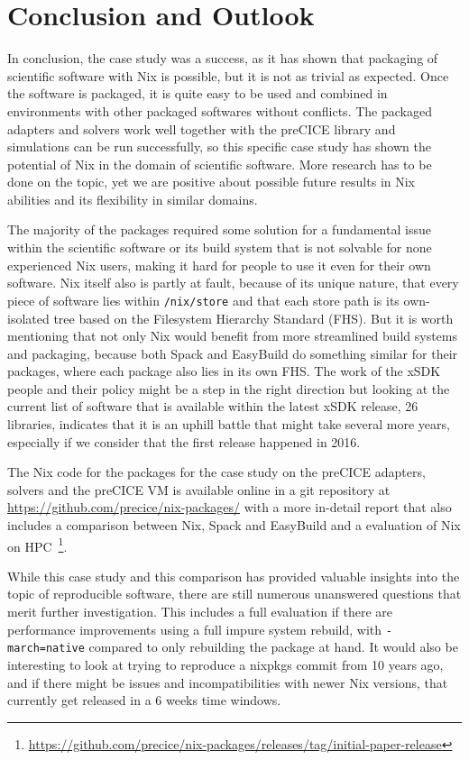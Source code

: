 \documentclass{eceasst}
\begin{document}
\section{Conclusion and Outlook}

In conclusion, the case study was a success, as it has shown that packaging of scientific software with Nix is possible, but it is not as trivial as expected.
Once the software is packaged, it is quite easy to be used and combined in environments with other packaged softwares without conflicts.
The packaged adapters and solvers work well together with the preCICE library and simulations can be run successfully, so this specific case study has shown the potential of Nix in the domain of scientific software.
More research has to be done on the topic, yet we are positive about possible future results in Nix abilities and its flexibility in similar domains.

The majority of the packages required some solution for a fundamental issue within the scientific software or its build system that is not solvable for none experienced Nix users, making it hard for people to use it even for their own software.
Nix itself also is partly at fault, because of its unique nature, that every piece of software lies within \texttt{/nix/store} and that each store path is its own-isolated tree based on the Filesystem Hierarchy Standard (FHS).
But it is worth mentioning that not only Nix would benefit from more streamlined build systems and packaging, because both Spack and EasyBuild do something similar for their packages, where each package also lies in its own FHS.
The work of the xSDK people and their policy might be a step in the right direction but looking at the current list of software that is available within the latest xSDK release, 26 libraries, indicates that it is an uphill battle that might take several more years, especially if we consider that the first release happened in 2016.

The Nix code for the packages for the case study on the preCICE adapters, solvers and the preCICE VM is available online in a git repository at \url{https://github.com/precice/nix-packages/} with a more in-detail report that also includes a comparison between Nix, Spack and EasyBuild and a evaluation of Nix on HPC~\footnote{\url{https://github.com/precice/nix-packages/releases/tag/initial-paper-release}}.

While this case study and this comparison has provided valuable insights into the topic of reproducible software, there are still numerous unanswered questions that merit further investigation.
This includes a full evaluation if there are performance improvements using a full impure system rebuild, with \texttt{-march=native} compared to only rebuilding the package at hand.
It would also be interesting to look at trying to reproduce a nixpkgs commit from 10 years ago, and if there might be issues and incompatibilities with newer Nix versions, that currently get released in a 6 weeks time windows.
\end{document}
